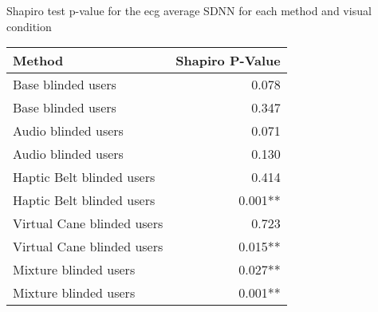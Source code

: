 
\centering
\caption{Shapiro test p-value for the ecg average SDNN for each method and visual condition}
\label{tab:shapiro_ecg_sdnn}
\begin{tabular}{lr}
\toprule
                    Method & Shapiro P-Value \\
\midrule
        Base blinded users &           0.078 \\
        Base blinded users &           0.347 \\
       Audio blinded users &           0.071 \\
       Audio blinded users &           0.130 \\
 Haptic Belt blinded users &           0.414 \\
 Haptic Belt blinded users &         0.001** \\
Virtual Cane blinded users &           0.723 \\
Virtual Cane blinded users &         0.015** \\
     Mixture blinded users &         0.027** \\
     Mixture blinded users &         0.001** \\
\bottomrule
\end{tabular}
